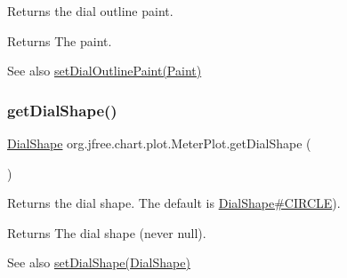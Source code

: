 Returns the dial outline paint.

\begin{DoxyReturn}{Returns}
The paint.
\end{DoxyReturn}
\begin{DoxySeeAlso}{See also}
\mbox{\hyperlink{classorg_1_1jfree_1_1chart_1_1plot_1_1_meter_plot_a3f0b3c240308ac9df18c9cdd5ddd9764}{set\+Dial\+Outline\+Paint(\+Paint)}} 
\end{DoxySeeAlso}
\mbox{\label{classorg_1_1jfree_1_1chart_1_1plot_1_1_meter_plot_a0e92b5cd1947bd12216f1695acd5f65e}} 
\subsubsection{\texorpdfstring{get\+Dial\+Shape()}{getDialShape()}}
{\footnotesize\ttfamily \mbox{\hyperlink{classorg_1_1jfree_1_1chart_1_1plot_1_1_dial_shape}{Dial\+Shape}} org.\+jfree.\+chart.\+plot.\+Meter\+Plot.\+get\+Dial\+Shape (\begin{DoxyParamCaption}{ }\end{DoxyParamCaption})}

Returns the dial shape. The default is \mbox{\hyperlink{classorg_1_1jfree_1_1chart_1_1plot_1_1_dial_shape_af7940604b87aac7098000a04700deb0f}{Dial\+Shape\#\+C\+I\+R\+C\+LE}}).

\begin{DoxyReturn}{Returns}
The dial shape (never {\ttfamily null}).
\end{DoxyReturn}
\begin{DoxySeeAlso}{See also}
\mbox{\hyperlink{classorg_1_1jfree_1_1chart_1_1plot_1_1_meter_plot_af91c31df0845c75304bf53fbe33c4487}{set\+Dial\+Shape(\+Dial\+Shape)}} 
\end{DoxySeeAlso}
\mbox{\label{classorg_1_1jfree_1_1chart_1_1plot_1_1_meter_plot_a0f107cfb9d7a9829dd8214c324bc2ea5}} 
